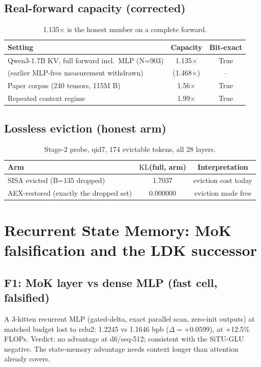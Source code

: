 \documentclass[11pt]{article}
\newcommand{\kl}{\mathrm{KL}}
\begin{document}
\subsection{Real-forward capacity (corrected)}
\begin{table}[H]\centering\small
\begin{tabular}{lcc}
\toprule
Setting & Capacity & Bit-exact \\
\midrule
Qwen3-1.7B KV, full forward incl.\ MLP (N=903) & 1.135$\times$ & True \\
\quad (earlier MLP-free measurement withdrawn) & (1.468$\times$) & -- \\
Paper corpus (240 tensors, 115M B) & 1.56$\times$ & True \\
Repeated context regime & 1.99$\times$ & True \\
\bottomrule
\end{tabular}
\caption{1.135$\times$ is the honest number on a complete forward.}
\end{table}

\subsection{Lossless eviction (honest arm)}
\begin{table}[H]\centering\small
\begin{tabular}{lcc}
\toprule
Arm & $\kl$(full, arm) & Interpretation \\
\midrule
SISA evicted (B=135 dropped) & 1.7037 & eviction cost today \\
AEX-restored (exactly the dropped set) & 0.000000 & eviction made free \\
\bottomrule
\end{tabular}
\caption{Stage-2 probe, qid7, 174 evictable tokens, all 28 layers.}
\end{table}

\section{Recurrent State Memory: MoK falsification and the LDK successor}
\label{sec:mok}
\subsection{F1: MoK layer vs dense MLP (fast cell, falsified)}
A 3-kitten recurrent MLP (gated-delta, exact parallel scan, zero-init
outputs) at matched budget lost to relu2: 1.2245 vs 1.1646 bpb
($\Delta=+0.0599$), at +12.5\% FLOPs. Verdict: no advantage at d6/seq-512;
consistent with the SiTU-GLU negative. The state-memory advantage needs
context longer than attention already covers.
\end{document}

